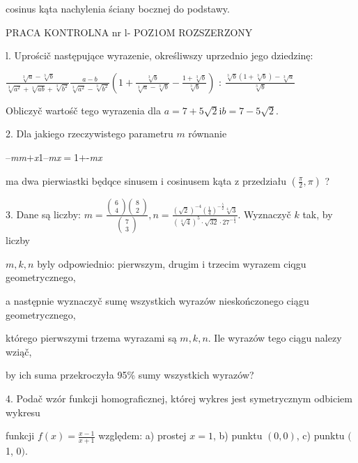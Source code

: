 \documentclass[a4paper,12pt]{article}
\begin{document}
cosinus kąta nachylenia ściany bocznej do podstawy.




PRACA KONTROLNA nr l- POZ1OM ROZSZERZONY

l. Uprościč następujące wyrazenie, określiwszy uprzednio jego dziedzinę:

$\displaystyle \frac{\sqrt[3]{a}-\sqrt[3]{b}}{\sqrt[3]{a^{2}}+\sqrt[3]{ab}+\sqrt[3]{b^{2}}} \displaystyle \frac{a-b}{\sqrt[3]{a^{2}}-\sqrt[3]{b^{2}}} (1+\displaystyle \frac{\sqrt[3]{b}}{\sqrt[3]{a}-\sqrt[3]{b}}-\frac{1+\sqrt[3]{b}}{\sqrt[3]{b}})$ : $\displaystyle \frac{\sqrt[3]{b}(1+\sqrt[3]{b})-\sqrt[3]{a}}{\sqrt[3]{b}}$

Obliczyč wartośč tego wyrazenia dla $a=7+5\sqrt{2} \mathrm{i} b=7-5\sqrt{2}.$

2. Dla jakiego rzeczywistego parametru $m$ równanie

--{\it mm}$+${\it x}1--{\it mx}$=$1$+$-{\it mx}

ma dwa pierwiastki będqce sinusem $\mathrm{i}$ cosinusem kąta $\mathrm{z}$ przedziału $(\displaystyle \frac{\pi}{2},\pi)$ ?

3. Dane są liczby: $m= \displaystyle \frac{\left(\begin{array}{l}
6\\
4
\end{array}\right)\left(\begin{array}{l}
8\\
2
\end{array}\right)}{\left(\begin{array}{l}
7\\
3
\end{array}\right)}, n= \displaystyle \frac{(\sqrt{2})^{-4}(\frac{1}{4})^{-\frac{5}{2}}\sqrt[4]{3}}{(\sqrt[4]{4})^{5}\cdot\sqrt{32}\cdot 27^{-\frac{1}{4}}}$. Wyznaczyč $k$ tak, by liczby

$m, k, n$ byly odpowiednio: pierwszym, drugim $\mathrm{i}$ trzecim wyrazem ciqgu geometrycznego,

a następnie wyznaczyč sumę wszystkich wyrazów nieskończonego ciągu geometrycznego,

którego pierwszymi trzema wyrazami są $m, k, n$. Ile wyrazów tego ciągu nalezy wziąč,

by ich suma przekroczyła 95\% sumy wszystkich wyrazów?

4. Podač wzór funkcji homograficznej, której wykres jest symetrycznym odbiciem wykresu

funkcji $f(x)=\displaystyle \frac{x-1}{x+1}$ względem: a) prostej $x=1$, b) punktu $(0,0)$, c) punktu $($1, $0).$
\end{document}
